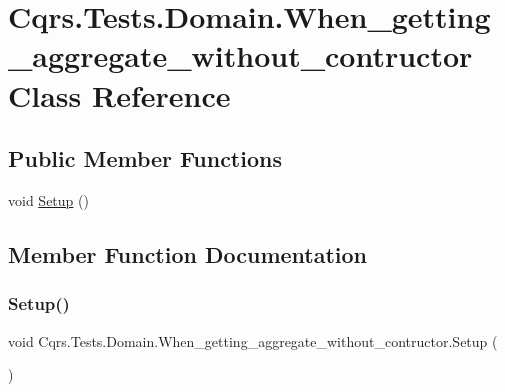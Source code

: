 \hypertarget{classCqrs_1_1Tests_1_1Domain_1_1When__getting__aggregate__without__contructor}{}\section{Cqrs.\+Tests.\+Domain.\+When\+\_\+getting\+\_\+aggregate\+\_\+without\+\_\+contructor Class Reference}
\label{classCqrs_1_1Tests_1_1Domain_1_1When__getting__aggregate__without__contructor}
\subsection*{Public Member Functions}
\begin{DoxyCompactItemize}
\item 
void \hyperlink{classCqrs_1_1Tests_1_1Domain_1_1When__getting__aggregate__without__contructor_a65bf40db9c414f3c79604a9aa08941be_a65bf40db9c414f3c79604a9aa08941be}{Setup} ()
\end{DoxyCompactItemize}


\subsection{Member Function Documentation}
\mbox{\label{classCqrs_1_1Tests_1_1Domain_1_1When__getting__aggregate__without__contructor_a65bf40db9c414f3c79604a9aa08941be_a65bf40db9c414f3c79604a9aa08941be}} 
\subsubsection{\texorpdfstring{Setup()}{Setup()}}
{\footnotesize\ttfamily void Cqrs.\+Tests.\+Domain.\+When\+\_\+getting\+\_\+aggregate\+\_\+without\+\_\+contructor.\+Setup (\begin{DoxyParamCaption}{ }\end{DoxyParamCaption})}


